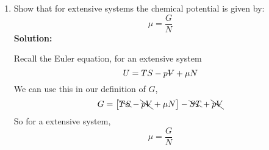 \documentclass[10pt]{article}
\newenvironment{Solution}
    {\textbf{Solution:}
    
    \vspace{5mm}
    \begin{tcolorbox}
    }
    {
    \end{tcolorbox}
    \vspace{5mm}
    }
\newcommand{\vol}{{\ooalign{\hfil$V$\hfil\cr\kern0.08em--\hfil\cr}}}
\begin{document}
\begin{enumerate}
\begin{Solution}
\end{Solution}
\newpage
\item Show that for extensive systems the chemical potential is given by:
\begin{equation}
    \mu=\frac{G}{N}
\end{equation}
\begin{Solution}
Recall the Euler equation, for an extensive system
\begin{equation}
    U = TS - p\vol + \mu N
\end{equation}
We can use this in our definition of $G$,
\begin{equation}
    G = \left[ \bcancel{TS} - \bcancel{p\vol} + \mu N \right] - \bcancel{ST} + \bcancel{p\vol} 
\end{equation}
So for a extensive system,
\begin{equation}
    \boxed{
    \mu = \frac{G}{N}
    }
\end{equation}

\end{Solution}    
    
\end{enumerate}
\end{document}
